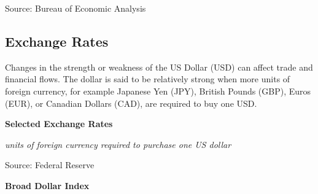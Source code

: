\documentclass{report}
\makeatletter
\newcommand{\tbllink}[1]{\href{https://raw.githubusercontent.com/bdecon/US-chartbook/master/chartbook/data/#1}{\faTable}}
\newcommand*\short[1]{\expandafter\@gobbletwo\number\numexpr#1\relax}
\newcommand{\stdnode}[3]{\node[below, align=left, shift=({#1,#2})]{#3};}
\newcommand{\dateaxisticks}{
		date coordinates in=x, axis line style={draw=none},
		xmax={2020-08-10},
		max space between ticks=40,	    
		xtick={{1990-01-01}, {1992-01-01}, {1994-01-01}, 
			{1996-01-01}, {1998-01-01}, {2000-01-01}, 
			{2002-01-01}, {2004-01-01}, {2006-01-01},
			{2008-01-01}, {2010-01-01}, {2012-01-01}, {2014-01-01},
		    {2016-01-01}, {2018-01-01}, {2020-01-01}},
		minor xtick={{1989-01-01}, {1991-01-01}, {1993-01-01},
			{1995-01-01}, {1997-01-01}, {1999-01-01}, 
			{2001-01-01}, {2003-01-01}, {2005-01-01}, {2007-01-01},
		    {2009-01-01}, {2011-01-01}, {2013-01-01}, {2015-01-01},
		    {2017-01-01}, {2019-01-01}},
		enlarge y limits={0.06}, enlarge x limits={0.01},
		}
\newcommand{\bbar}[2]{extra #1 ticks = {{#2}}, extra #1 tick labels = ,
		extra #1 tick style = {grid=major, grid style={thick, black!25}},}
\newcommand{\stdline}[4]{\addplot[very thick, no markers, color=#1] 
		table [x=#2, y=#3, col sep=comma] {#4};	}
\newcommand{\rbars}{
		\fill[color=black!10] (axis cs:{1990-07-01},\pgfkeysvalueof{/pgfplots/ymin}) rectangle 
			(axis cs:{1991-03-01}, \pgfkeysvalueof{/pgfplots/ymax});
		\fill[color=black!10] (axis cs:{2007-12-01},\pgfkeysvalueof{/pgfplots/ymin}) rectangle 
			(axis cs:{2009-07-01}, \pgfkeysvalueof{/pgfplots/ymax});
		\fill[color=black!10] (axis cs:{2001-03-01},\pgfkeysvalueof{/pgfplots/ymin}) rectangle 
			(axis cs:{2001-11-01}, \pgfkeysvalueof{/pgfplots/ymax});
		\fill[color=black!10] (axis cs:{2020-02-01},\pgfkeysvalueof{/pgfplots/ymin}) rectangle 
			(axis cs:{2020-09-01}, \pgfkeysvalueof{/pgfplots/ymax});}
\makeatother
\begin{document}
{{{{{{\begin{minipage}{0.76\textwidth}
\footnotesize{Source: Bureau of Economic Analysis} \hfill \tbllink{iip.csv}
\end{minipage}

\newpage

\begin{minipage}{0.76\textwidth}

\subsection*{\color{black!70} \seriffont Exchange Rates}

\small Changes in the strength or weakness of the US Dollar (USD) can affect trade and financial flows. The dollar is said to be relatively strong when more units of foreign currency, for example Japanese Yen (JPY), British Pounds (GBP), Euros (EUR), or Canadian Dollars (CAD), are required to buy one USD.\\

 

\vspace{4mm}

\normalsize \textbf{Selected Exchange Rates}

\footnotesize{\textit{units of foreign currency required to purchase one US dollar}}

\hspace*{-2mm} 

\footnotesize{Source: Federal Reserve} \hfill \tbllink{fx1.csv}
\end{minipage}

\vspace{4mm}
\begin{minipage}{0.33\textwidth}
\normalsize \textbf{Broad Dollar Index}


\end{minipage}}}}}}}
\end{document}
